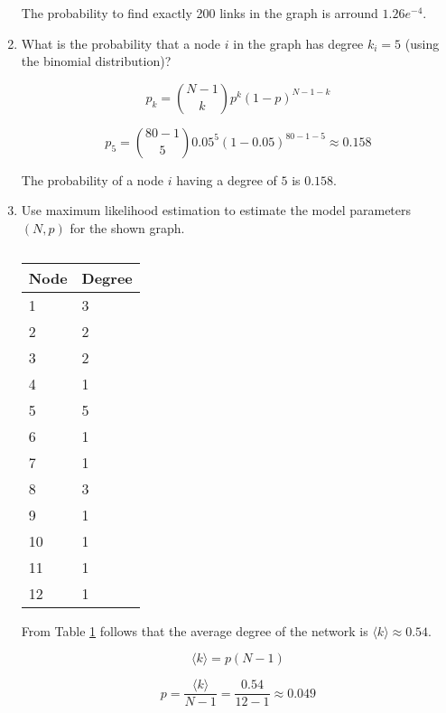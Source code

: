 \begin{enumerate}
	The probability to find exactly 200 links in the graph is arround $1.26e^{-4}$.
	
	\item What is the probability that a node $i$ in the graph has degree $k_i = 5$ (using the binomial distribution)?
	\vspace{0.25cm}
	
	\begin{equation}
	p_k = {N - 1 \choose k} p^k (1-p)^{N-1-k}
	\end{equation}
	
	\begin{equation}
	p_5 = {80 - 1 \choose 5} 0.05^5 (1-0.05)^{80-1-5} \approx 0.158
	\end{equation}
	
	The probability of a node $i$ having a degree of $5$ is $0.158$.
	
	\item Use maximum likelihood estimation to estimate the model parameters $(N, p)$ for the shown graph.
	\vspace{0.25cm}
	
	\begin{table}[h!]
\centering
\begin{tabular}{ll}
\hline
\rowcolor{lightgray}
Node & Degree \\ \hline
1    & 3      \\
2    & 2      \\
3    & 2      \\
4    & 1      \\
5    & 5      \\
6    & 1      \\
7    & 1      \\
8    & 3      \\
9    & 1      \\
10   & 1      \\
11   & 1      \\
12   & 1      \\ \hline
\end{tabular}
\caption{}
\label{tab:node_degrees}
\end{table}

From Table \ref{tab:node_degrees} follows that the average degree of the network is $\langle k \rangle \approx 0.54$.

\begin{equation}
\langle k \rangle = p(N-1)
\end{equation}

\begin{equation}
p = \frac{\langle k \rangle}{N-1} = \frac{0.54}{12-1} \approx 0.049
\end{equation}


\end{enumerate}
